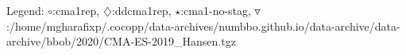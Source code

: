 Legend: {\color{NavyBlue}$\circ$}:cma1rep, {\color{Magenta}$\diamondsuit$}:ddcma1rep, {\color{Orange}$\star$}:cma1-no-stag, {\color{CornflowerBlue}$\triangledown$}:/home/mgharafixp/.cocopp/data-archives/numbbo.github.io/data-archive/data-archive/bbob/2020/CMA-ES-2019\_Hansen.tgz